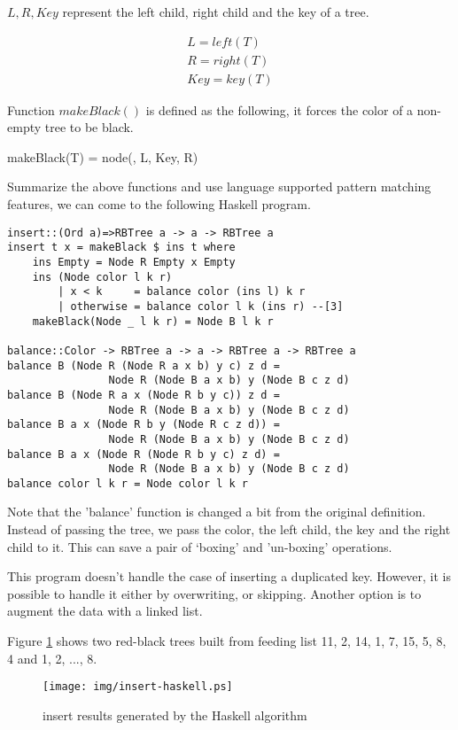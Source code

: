 \documentclass{article}
\begin{document}
$L, R, Key$ represent the left child, right child and the key of a tree.

\[
  \begin{array}{l}
  L = left(T) \\
  R = right(T) \\
  Key = key(T)
  \end{array}
\]


Function $makeBlack()$ is defined as the following, it forces the color
of a non-empty tree to be black.

\be
makeBlack(T) = node(, L, Key, R)
\ee

Summarize the above functions and use language supported pattern matching
features, we can come to the following Haskell program.

\lstset{language=Haskell}
\begin{lstlisting}
insert::(Ord a)=>RBTree a -> a -> RBTree a
insert t x = makeBlack $ ins t where
    ins Empty = Node R Empty x Empty
    ins (Node color l k r)
        | x < k     = balance color (ins l) k r
        | otherwise = balance color l k (ins r) --[3]
    makeBlack(Node _ l k r) = Node B l k r

balance::Color -> RBTree a -> a -> RBTree a -> RBTree a
balance B (Node R (Node R a x b) y c) z d = 
                Node R (Node B a x b) y (Node B c z d)
balance B (Node R a x (Node R b y c)) z d = 
                Node R (Node B a x b) y (Node B c z d)
balance B a x (Node R b y (Node R c z d)) = 
                Node R (Node B a x b) y (Node B c z d)
balance B a x (Node R (Node R b y c) z d) = 
                Node R (Node B a x b) y (Node B c z d)
balance color l k r = Node color l k r
\end{lstlisting} %

Note that the 'balance' function is changed a bit from the original
definition. Instead of passing the tree, we pass
the color, the left child, the key and the right child to it.
This can save a pair of `boxing' and 'un-boxing' operations.

This program doesn't handle the case of inserting a duplicated key.
However, it is possible to handle it either by overwriting,
or skipping. Another option is to augment the data with a linked 
list\cite{CLRS}.

Figure \ref{fig:insert-example} shows two red-black trees
built from feeding list 11, 2, 14, 1, 7, 15, 5, 8, 4 and 1, 2, ..., 8.

\begin{figure}[htbp]
  \centering
  \texttt{[image: img/insert-haskell.ps]}
  \caption{insert results generated by the Haskell algorithm} \label{fig:insert-example}
\end{figure}
\end{document}
